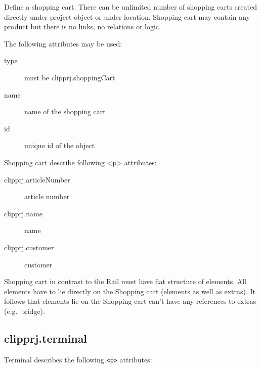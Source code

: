 \documentclass[%
	a4paper,
	oneside,
	listof=numbered,
	parskip=half,
	headsepline=true,
	footsepline=false,
	normalheadings,
	0.7headlines,
	headexclude,
	]{scrbook}
\begin{document}
Define a shopping cart.
There can be unlimited number of shopping carts created directly under project object or under location.
Shopping cart may contain any product but there is no links, no relations or logic.

The following attributes may be used:

\begin{description}
	\item[type] must be clipprj.shoppingCart
	\item[name] name of the shopping cart
	\item[id] unique id of the object
\end{description}

Shopping cart describe following <p> attributes: 

\begin{description}
	\item[clipprj.articleNumber] article number 
	\item[clipprj.name] name 
	\item[clipprj.customer] customer 
\end{description}
 
Shopping cart in contrast to the Rail must have flat structure of elements.
All elements have to lie directly on the Shopping cart (elements as well as extras).
It follows that elements lie on the Shopping cart can’t have any references to extras (e.g.\ bridge).

\subsection{clipprj.terminal} 
 
Terminal describes the following \verb|<p>| attributes: 
\end{document}
